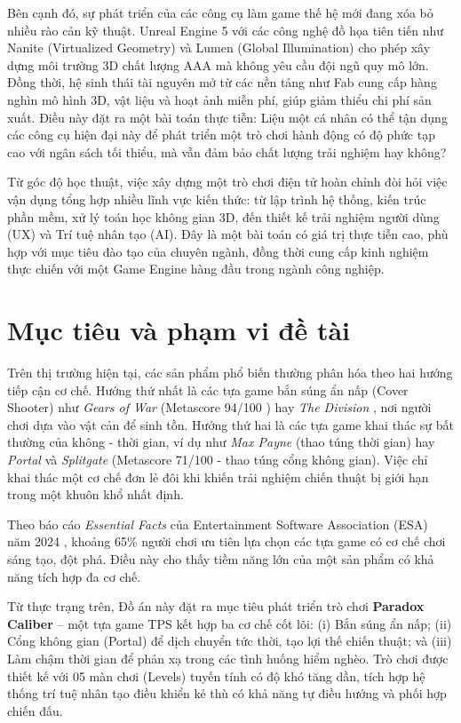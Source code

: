 \documentclass[../DoAn.tex]{subfiles}
\begin{document}
Bên cạnh đó, sự phát triển của các công cụ làm game thế hệ mới đang xóa bỏ nhiều rào cản kỹ thuật. Unreal Engine 5 \cite{UE56Doc} với các công nghệ đồ họa tiên tiến như Nanite (Virtualized Geometry) và Lumen (Global Illumination) cho phép xây dựng môi trường 3D chất lượng AAA mà không yêu cầu đội ngũ quy mô lớn. Đồng thời, hệ sinh thái tài nguyên mở từ các nền tảng như Fab \cite{EpicFab} cung cấp hàng nghìn mô hình 3D, vật liệu và hoạt ảnh miễn phí, giúp giảm thiểu chi phí sản xuất. Điều này đặt ra một bài toán thực tiễn: Liệu một cá nhân có thể tận dụng các công cụ hiện đại này để phát triển một trò chơi hành động có độ phức tạp cao với ngân sách tối thiểu, mà vẫn đảm bảo chất lượng trải nghiệm hay không?

Từ góc độ học thuật, việc xây dựng một trò chơi điện tử hoàn chỉnh đòi hỏi việc vận dụng tổng hợp nhiều lĩnh vực kiến thức: từ lập trình hệ thống, kiến trúc phần mềm, xử lý toán học không gian 3D, đến thiết kế trải nghiệm người dùng (UX) và Trí tuệ nhân tạo (AI). Đây là một bài toán có giá trị thực tiễn cao, phù hợp với mục tiêu đào tạo của chuyên ngành, đồng thời cung cấp kinh nghiệm thực chiến với một Game Engine hàng đầu trong ngành công nghiệp.

\section{Mục tiêu và phạm vi đề tài}
\label{section:1.2}

Trên thị trường hiện tại, các sản phẩm phổ biến thường phân hóa theo hai hướng tiếp cận cơ chế. Hướng thứ nhất là các tựa game bắn súng ẩn nấp (Cover Shooter) như \textit{Gears of War} (Metascore 94/100 \cite{MetacriticGearsOfWar}) hay \textit{The Division} \cite{MetacriticTheDivision}, nơi người chơi dựa vào vật cản để sinh tồn. Hướng thứ hai là các tựa game khai thác sự bất thường của không - thời gian, ví dụ như \textit{Max Payne} (thao túng thời gian) hay \textit{Portal} \cite{MetacriticPortal} và \textit{Splitgate} (Metascore 71/100 \cite{MetacriticSplitgate} - thao túng cổng không gian). Việc chỉ khai thác một cơ chế đơn lẻ đôi khi khiến trải nghiệm chiến thuật bị giới hạn trong một khuôn khổ nhất định.

Theo báo cáo \textit{Essential Facts} của Entertainment Software Association (ESA) năm 2024 \cite{ESA2024}, khoảng 65\% người chơi ưu tiên lựa chọn các tựa game có cơ chế chơi sáng tạo, đột phá. Điều này cho thấy tiềm năng lớn của một sản phẩm có khả năng tích hợp đa cơ chế.

Từ thực trạng trên, Đồ án này đặt ra mục tiêu phát triển trò chơi \textbf{Paradox Caliber} -- một tựa game TPS kết hợp ba cơ chế cốt lõi: (i) Bắn súng ẩn nấp; (ii) Cổng không gian (Portal) để dịch chuyển tức thời, tạo lợi thế chiến thuật; và (iii) Làm chậm thời gian để phản xạ trong các tình huống hiểm nghèo. Trò chơi được thiết kế với 05 màn chơi (Levels) tuyến tính có độ khó tăng dần, tích hợp hệ thống trí tuệ nhân tạo điều khiển kẻ thù có khả năng tự điều hướng và phối hợp chiến đấu.
\end{document}
